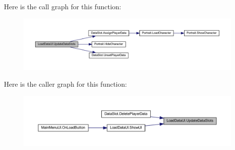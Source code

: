 Here is the call graph for this function\+:\nopagebreak
\begin{figure}[H]
\begin{center}
\leavevmode
\includegraphics[width=350pt]{class_load_data_u_i_a2a36a17c6455a8ca8ee3b92dbbce0503_cgraph}
\end{center}
\end{figure}
Here is the caller graph for this function\+:\nopagebreak
\begin{figure}[H]
\begin{center}
\leavevmode
\includegraphics[width=350pt]{class_load_data_u_i_a2a36a17c6455a8ca8ee3b92dbbce0503_icgraph}
\end{center}
\end{figure}
